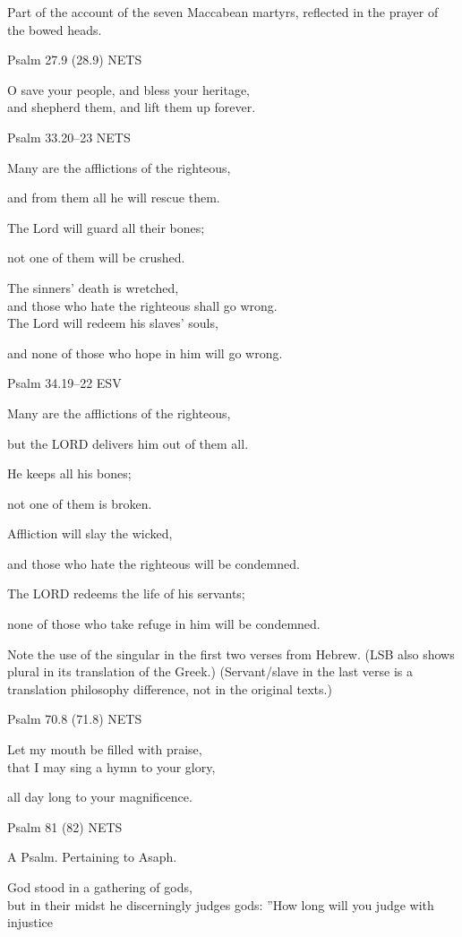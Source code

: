 \documentclass[
]{article}
\newcommand{\RL}[1]{\beginR #1\endR}
\begin{document}
Part of the account of the seven Maccabean martyrs, reflected in the
prayer of the bowed heads.

Psalm 27.9 (28.9) NETS

O save your people, and bless your heritage,\\
and shepherd them, and lift them up forever.

Psalm 33.20--23 NETS

Many are the afflictions of the righteous,

and from them all he will rescue them.

The Lord will guard all their bones;

not one of them will be crushed.

The sinners\RL{'} death is wretched,\\
and those who hate the righteous shall go wrong.\\
The Lord will redeem his slaves\RL{'} souls,

and none of those who hope in him will go wrong.

Psalm 34.19--22 ESV

Many are the afflictions of the righteous,

but the LORD delivers him out of them all.

He keeps all his bones;

not one of them is broken.

Affliction will slay the wicked,

and those who hate the righteous will be condemned.

The LORD redeems the life of his servants;

none of those who take refuge in him will be condemned.

Note the use of the singular in the first two verses from Hebrew. (LSB
also shows plural in its translation of the Greek.) (Servant/slave in
the last verse is a translation philosophy difference, not in the
original texts.)

Psalm 70.8 (71.8) NETS

Let my mouth be filled with praise,\\
that I may sing a hymn to your glory,

all day long to your magnificence.

Psalm 81 (82) NETS

A Psalm. Pertaining to Asaph.

God stood in a gathering of gods,\\
but in their midst he discerningly judges gods:\RL{\hfill\break
''}How long will you judge with injustice
\end{document}
